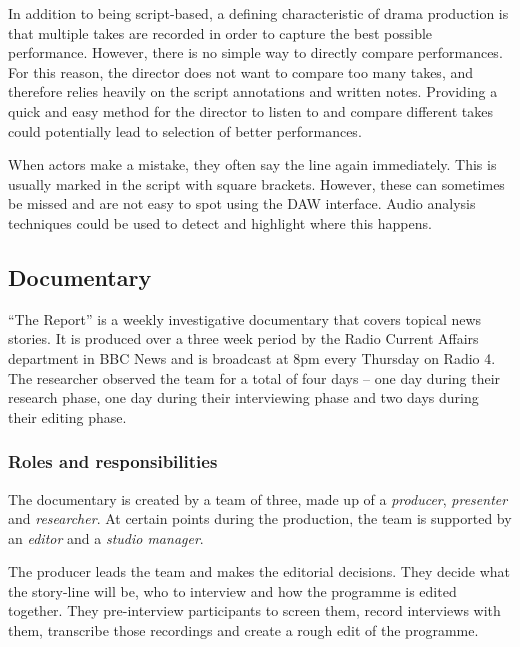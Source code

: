 In addition to being script-based, a defining characteristic of drama production is that multiple takes are recorded in
order to capture the best possible performance. However, there is no simple way to directly compare performances. For
this reason, the director does not want to compare too many takes, and therefore relies heavily on the script
annotations and written notes. Providing a quick and easy method for the director to listen to and compare different
takes could potentially lead to selection of better performances.

When actors make a mistake, they often say the line again immediately. This is usually marked in the script with square
brackets. However, these can sometimes be missed and are not easy to spot using the DAW interface.  Audio analysis
techniques could be used to detect and highlight where this happens.


\subsection{Documentary}\label{sec:doc}
``The Report'' is a weekly investigative documentary that covers topical news stories. It is produced over a three week
period by the Radio Current Affairs department in BBC News and is broadcast at 8pm every Thursday on Radio 4. The
researcher observed the team for a total of four days -- one day during their research phase, one day during their
interviewing phase and two days during their editing phase.

\subsubsection{Roles and responsibilities}
The documentary is created by a team of three, made up of a \textit{producer}, \textit{presenter} and
\textit{researcher}.  At certain points during the production, the team is supported by an \textit{editor} and
a \textit{studio manager}.

The producer leads the team and makes the editorial decisions. They decide what the story-line will be, who to interview
and how the programme is edited together. They pre-interview participants to screen them, record interviews with
them, transcribe those recordings and create a rough edit of the programme.

